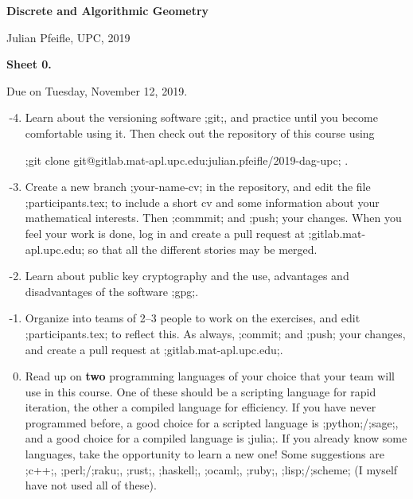 \documentclass[11pt]{amsart}
\newcommand{\alert}[1]{\textbf{\color{red}#1}}
\begin{document}
\begin{center}
\textbf{\sffamily
   Discrete and Algorithmic Geometry }

\medskip
   Julian Pfeifle,
   UPC, 2019
\end{center}

\bigskip

\begin{center}
  \textbf{\sffamily Sheet 0.}

  \bigskip
  \bigskip
  \bigskip
  Due on Tuesday, November 12, 2019.

\end{center}

\bigskip
\bigskip
\bigskip

\begin{enumerate}
  \setcounter{enumi}{-5}
\item
  Learn about the versioning software ;git;, and practice until you become comfortable using it.
  Then check out the repository of this course using
  \begin{center}
    ;git clone git@gitlab.mat-apl.upc.edu:julian.pfeifle/2019-dag-upc; .
  \end{center}

  \medskip
\item
  Create a new branch ;your-name-cv; in the repository, and edit the file ;participants.tex; to include a short cv and some information about your mathematical interests.
  Then ;commmit; and ;push; your changes. When you feel your work is done, log in and create a pull request at ;gitlab.mat-apl.upc.edu; so that all the different stories may be merged.
  
  \medskip
\item
  Learn about public key cryptography and the use, advantages and disadvantages of the software ;gpg;.

  \medskip
\item
  Organize into teams of 2--3 people to work on the exercises, and
  edit  ;participants.tex; to reflect this.
  As always, ;commit; and ;push; your changes, and create a pull request at ;gitlab.mat-apl.upc.edu;.

  \medskip
\item
  Read up on \alert{two} programming languages of your choice that your team will use in this course.
  One of these should be a scripting language for rapid iteration, the other a compiled language for efficiency.
  If you have never programmed before, a good choice for a scripted language is ;python;/;sage;, and a good choice for a compiled language is ;julia;.
  If you already know some languages, take the opportunity to learn a new one! Some suggestions are ;c++;, ;perl;/;raku;, ;rust;, ;haskell;, ;ocaml;, ;ruby;, ;lisp;/;scheme;
  (I myself have not used all of these).


\end{enumerate}
\end{document}
